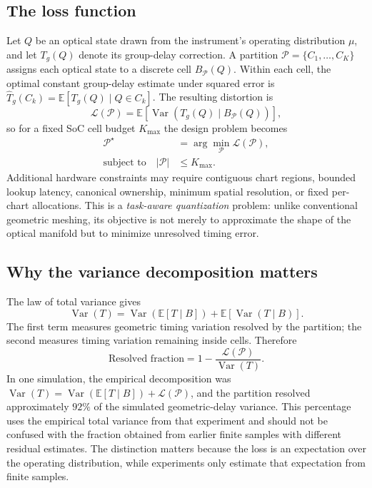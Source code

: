 \documentclass[11pt]{article}
\begin{document}
\subsection{The loss function}

Let $Q$ be an optical state drawn from the instrument's operating distribution $\mu$,
and let $T_g(Q)$ denote its group-delay correction. A partition
$\mathcal{P} = \{C_1, \ldots, C_K\}$ assigns each optical state to a discrete cell
$B_{\mathcal{P}}(Q)$. Within each cell, the optimal constant group-delay estimate under
squared error is
$\widehat{T}_g(C_k) = \mathbb{E}[T_g(Q) \mid Q \in C_k]$. The resulting distortion is
\begin{equation}
\boxed{\mathcal{L}(\mathcal{P}) = \mathbb{E}\!\left[ \operatorname{Var}\!\left(T_g(Q) \mid B_{\mathcal{P}}(Q)\right) \right],}
\end{equation}
so for a fixed SoC cell budget $K_{\max}$ the design problem becomes
\begin{equation}
\boxed{\begin{aligned} \mathcal{P}^\star &= \arg\min_{\mathcal{P}} \mathcal{L}(\mathcal{P}), \\ \text{subject to} \quad |\mathcal{P}| &\le K_{\max}. \end{aligned}}
\end{equation}
Additional hardware constraints may require contiguous chart regions, bounded lookup
latency, canonical ownership, minimum spatial resolution, or fixed per-chart
allocations. This is a \emph{task-aware quantization} problem: unlike conventional
geometric meshing, its objective is not merely to approximate the shape of the optical
manifold but to minimize unresolved timing error.

\subsection{Why the variance decomposition matters}

The law of total variance gives
\begin{equation}
\operatorname{Var}(T) = \operatorname{Var}(\mathbb{E}[T \mid B]) + \mathbb{E}[\operatorname{Var}(T \mid B)].
\end{equation}
The first term measures geometric timing variation resolved by the partition; the second
measures timing variation remaining inside cells. Therefore
\begin{equation}
\boxed{\text{Resolved fraction} = 1 - \frac{\mathcal{L}(\mathcal{P})}{\operatorname{Var}(T)}.}
\end{equation}
In one simulation, the empirical decomposition was
$\operatorname{Var}(T) = \operatorname{Var}(\mathbb{E}[T\mid B]) + \mathcal{L}(\mathcal{P})$,
and the partition resolved approximately $92\%$ of the simulated geometric-delay
variance. This percentage uses the empirical total variance from that experiment and
should not be confused with the fraction obtained from earlier finite samples with
different residual estimates. The distinction matters because the loss is an expectation
over the operating distribution, while experiments only estimate that expectation from
finite samples.
\end{document}

